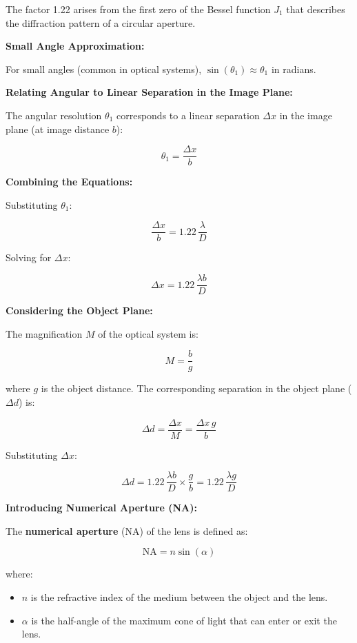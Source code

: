 \documentclass[
  a4paper,
]{book}
\providecommand{\tightlist}{%
  \setlength{\itemsep}{0pt}\setlength{\parskip}{0pt}}
\begin{document}
The factor 1.22 arises from the first zero of the Bessel function
\(J_1\) that describes the diffraction pattern of a circular aperture.

\textbf{Small Angle Approximation:}

For small angles (common in optical systems),
\(\sin(\theta_1) \approx \theta_1\) in radians.

\textbf{Relating Angular to Linear Separation in the Image Plane:}

The angular resolution \(\theta_1\) corresponds to a linear separation
\(\Delta x\) in the image plane (at image distance \(b\)):

\[
   \theta_1 = \frac{\Delta x}{b}
   \]

\textbf{Combining the Equations:}

Substituting \(\theta_1\):

\[
   \frac{\Delta x}{b} = 1.22\, \frac{\lambda}{D}
   \]

Solving for \(\Delta x\):

\[
   \Delta x = 1.22\, \frac{\lambda b}{D}
   \]

\textbf{Considering the Object Plane:}

The magnification \(M\) of the optical system is:

\[
   M = \frac{b}{g}
   \]

where \(g\) is the object distance. The corresponding separation in the
object plane (\(\Delta d\)) is:

\[
   \Delta d = \frac{\Delta x}{M} = \frac{\Delta x \, g}{b}
   \]

Substituting \(\Delta x\):

\[
   \Delta d = 1.22\, \frac{\lambda b}{D} \times \frac{g}{b} = 1.22\, \frac{\lambda g}{D}
   \]

\textbf{Introducing Numerical Aperture (NA):}

The \textbf{numerical aperture} (NA) of the lens is defined as:

\[
   \text{NA} = n \sin(\alpha)
   \]

where:

\begin{itemize}
\tightlist
\item
  \(n\) is the refractive index of the medium between the object and the
  lens.
\item
  \(\alpha\) is the half-angle of the maximum cone of light that can
  enter or exit the lens.
\end{itemize}
\end{document}
